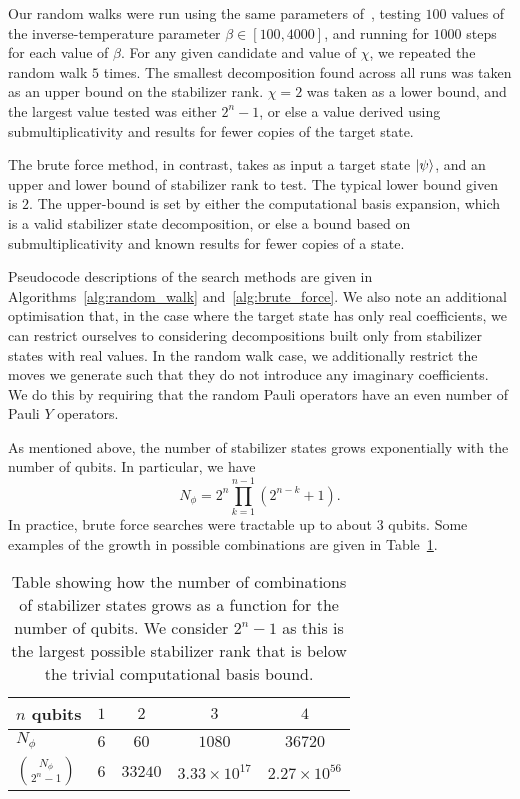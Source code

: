 Our random walks were run using the same parameters of~\cite{Bravyi2015}, testing $100$ values of the inverse-temperature parameter $\beta\in [100,4000]$, and running for $1000$ steps for each value of $\beta$. For any given candidate and value of $\chi$, we repeated the random walk $5$ times. The smallest decomposition found across all runs was taken as an upper bound on the stabilizer rank. $\chi=2$ was taken as a lower bound, and the largest value tested was either $2^{n}-1$, or else a value derived using submultiplicativity and results for fewer copies of the target state.\par
The brute force method, in contrast, takes as input a target state $\ket{\psi}$, and an upper and lower bound of stabilizer rank to test. The typical lower bound given is $2$. The upper-bound is set by either the computational basis expansion, which is a valid stabilizer state decomposition, or else a bound based on submultiplicativity and known results for fewer copies of a state.\par
Pseudocode descriptions of the search methods are given in Algorithms~\ref{alg:random_walk} and~\ref{alg:brute_force}. We also note an additional optimisation that, in the case where the target state has only real coefficients, we can restrict ourselves to considering decompositions built only from stabilizer states with real values. In the random walk case, we additionally restrict the moves we generate such that they do not introduce any imaginary coefficients. We do this by requiring that the random Pauli operators have an even number of Pauli $Y$ operators.\par
As mentioned above, the number of stabilizer states grows exponentially with the number of qubits. In particular, we have~\cite{Aaronson2004}
\begin{equation}
N_{\phi} = 2^{n}\prod_{k=1}^{n-1}\left(2^{n-k}+1\right).
\end{equation}
In practice, brute force searches were tractable up to about $3$ qubits. Some examples of the growth in possible combinations are given in Table~\ref{tab:n_combinations}.\par
\begin{table}[H]
\centering
\begin{tabular}{| l | c | c | c | c |}
\hline
$n$ qubits & $1$ & $2$ & $3$ & $4$ \\ \hline
$N_{\phi}$ & $6$ & $60$ & $1080$ & $36720$ \\ \hline
$\binom{N_{\phi}}{2^{n}-1}$ & $6$ & $33240$ & $3.33\times10^{17}$ & $2.27\times 10^{56}$ \\ \hline
\end{tabular}
\caption{Table showing how the number of combinations of stabilizer states grows as a function for the number of qubits. We consider $2^{n}-1$ as this is the largest possible stabilizer rank that is below the trivial computational basis bound.}
\label{tab:n_combinations}
\end{table}

